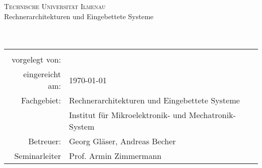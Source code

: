 
\begin{titlepage}
	\centering
	{\Large \textsc{Technische Universität Ilmenau}}\\[3ex]
	{\Large Rechnerarchitekturen und Eingebettete Systeme}\\[3ex]
	\vfill
	{\Large \textbf{\artderausarbeitung}}\\[4ex]
	{\large \textbf{\themaderarbeit}}\\[5ex]
	\vfill
	\begin{tabular}{rl}
		\hline\\
		vorgelegt von:          & \quad \namedesautors\\[1,5ex]
		eingereicht am:         & \quad 
		\today \\[1,5ex]
		Fachgebiet:            & \quad Rechnerarchitekturen und Eingebettete Systeme\\[0,5ex]
								& \quad Institut für Mikroelektronik- und Mechatronik-System\\[1,5ex]
		Betreuer:            	& \quad Georg Gläser, Andreas Becher \\[1,5ex]
		Seminarleiter           & \quad Prof. Armin Zimmermann \\[1,5ex]	
	\end{tabular}
	\vfill
\end{titlepage}